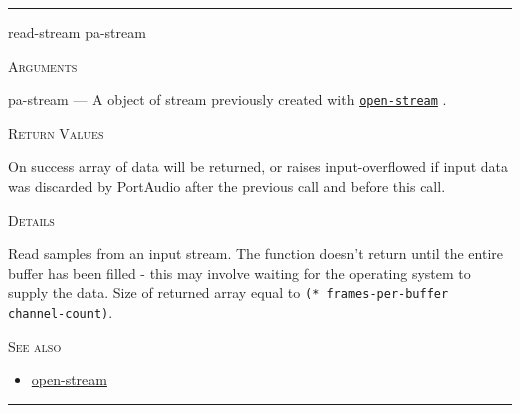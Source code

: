 \documentclass[a4paper]{report}
\begin{document}
  

    \rule{\linewidth}{0.1mm}
    
    \label{portaudio__fun__read-stream}
    \begin{defun}[Function]
    read-stream pa-stream


    
    \bigskip
    \textsc{Arguments}

pa-stream
	--- A object of stream previously created with \hyperref[portaudio__fun__open-stream]{\texttt{open-stream}}
  .




    
    \bigskip
    \textsc{Return Values}


On success array of data will be returned, or raises input-overflowed if input data was discarded by PortAudio after the previous call and before this call. 


	
    \bigskip
    \textsc{Details}

Read samples from an input stream. The function doesn't return until the entire buffer has been filled - this may involve waiting for the operating system to supply the data. Size of returned array equal to \texttt{(* frames-per-buffer channel-count)}.






      
    \bigskip
    \textsc{See also}


	
    \begin{itemize}
    
	  
    \item
    \hyperref[portaudio__fun__open-stream]{open-stream}
    
	
    \end{itemize}
  
      


    
    \end{defun}
  
  

    \rule{\linewidth}{0.1mm}
    
\end{document}

